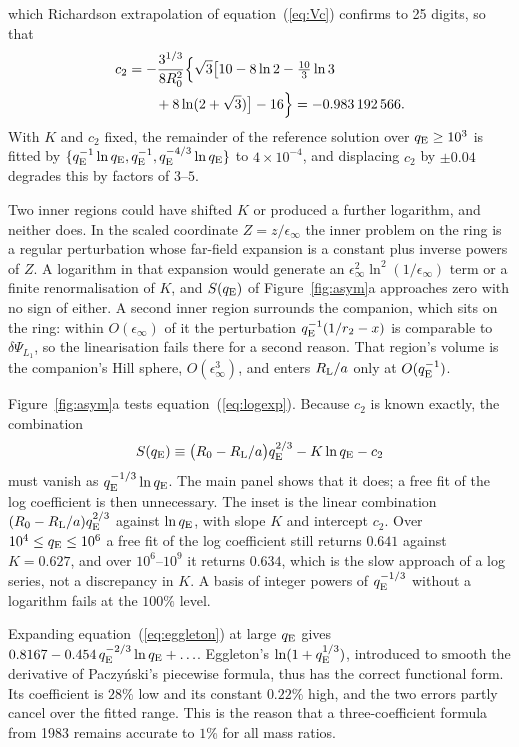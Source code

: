\documentclass[twocolumn]{aastex702}
\newcommand{\qE}{q_{\rm E}}
\newcommand{\RL}{R_{\rm L}}
\begin{document}
which Richardson extrapolation of equation~(\ref{eq:Vc}) confirms to 25 digits,
so that
\begin{equation}
\begin{split}
c_2&=-\frac{3^{1/3}}{8R_0^2}\Bigl\{\sqrt3\bigl[10-8\ln2-\tfrac{10}{3}\ln3\\
&\qquad+8\ln(2+\sqrt3)\bigr]-16\Bigr\}=-0.983\,192\,566.
\end{split}
\label{eq:c2}
\end{equation}
With $K$ and $c_2$ fixed, the remainder of the reference solution over $\qE\ge10^3$ is fitted by $\{\qE^{-1}\ln\qE,\qE^{-1},\qE^{-4/3}\ln\qE\}$ to $4\times10^{-4}$, and displacing $c_2$ by $\pm0.04$ degrades this by factors of $3$--$5$.

Two inner regions could have shifted $K$ or produced a further logarithm, and neither does. In the scaled coordinate $Z=z/\epsilon_\infty$ the inner problem on the ring is a regular perturbation whose far-field expansion is a constant plus inverse powers of $Z$. A logarithm in that expansion would generate an $\epsilon_\infty^2\ln^2(1/\epsilon_\infty)$ term or a finite renormalisation of $K$, and $S(\qE)$ of Figure~\ref{fig:asym}a approaches zero with no sign of either. A second inner region surrounds the companion, which sits on the ring: within $O(\epsilon_\infty)$ of it the perturbation $\qE^{-1}(1/r_2-x)$ is comparable to $\delta\Psi_{L_1}$, so the linearisation fails there for a second reason. That region's volume is the companion's Hill sphere, $O(\epsilon_\infty^3)$, and enters $\RL/a$ only at $O(\qE^{-1})$.

Figure~\ref{fig:asym}a tests equation~(\ref{eq:logexp}). Because $c_2$ is known exactly, the combination
\begin{equation}
S(\qE)\equiv\bigl(R_0-\RL/a\bigr)\qE^{2/3}-K\ln\qE-c_2
\end{equation}
must vanish as $\qE^{-1/3}\ln\qE$. The main panel shows that it does; a free fit of the log coefficient is then unnecessary. The inset is the linear combination $(R_0-\RL/a)\qE^{2/3}$ against $\ln\qE$, with slope $K$ and intercept $c_2$. Over $10^4\le\qE\le10^6$ a free fit of the log coefficient still returns $0.641$ against $K=0.627$, and over $10^6$--$10^9$ it returns $0.634$, which is the slow approach of a log series, not a discrepancy in $K$. A basis of integer powers of $\qE^{-1/3}$ without a logarithm fails at the $100\%$ level.

Expanding equation~(\ref{eq:eggleton}) at large $\qE$ gives $0.8167-0.454\,\qE^{-2/3}\ln\qE+\ldots$. Eggleton's $\ln(1+\qE^{1/3})$, introduced to smooth the derivative of Paczy\'nski's piecewise formula, thus has the correct functional form. Its coefficient is $28\%$ low and its constant $0.22\%$ high, and the two errors partly cancel over the fitted range. This is the reason that a three-coefficient formula from 1983 remains accurate to $1\%$ for all mass ratios.
\end{document}

